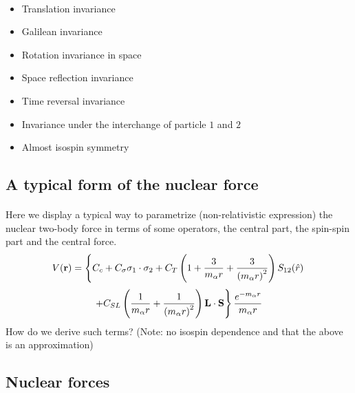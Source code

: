 \documentclass[%
twoside,                 %
final,                   %
10pt]{article}
\begin{document}
\paragraph{}
\begin{itemize}
\item Translation invariance

\item Galilean invariance

\item Rotation invariance in space

\item Space reflection invariance

\item Time reversal invariance

\item Invariance under the interchange of particle $1$ and $2$

\item Almost isospin symmetry
\end{itemize}

\noindent





\subsection*{A typical form of the nuclear force}

\paragraph{}
Here we display a typical way to parametrize (non-relativistic expression) the nuclear two-body force
in terms of some operators, the central part, the spin-spin part and the central force.
\[
V(\mathbf{r})= \left\{ C_c + C_\mathbf{\sigma} \mathbf{\sigma}_1\cdot\mathbf{\sigma}_2
 + C_T \left( 1 + {3\over m_\alpha r} + {3\over\left(m_\alpha r\right)^2}\right) S_{12} (\hat r)\right. 
\]
\[
\left. + C_{SL} \left( {1\over m_\alpha r} + {1\over \left( m_\alpha r\right)^2}
\right) \mathbf{L}\cdot \mathbf{S}
\right\} \frac{e^{-m_\alpha r}}{m_\alpha r}
\]
How do we derive such terms?  (Note: no isospin dependence and that the above is an approximation)




\subsection*{Nuclear forces}
\end{document}

